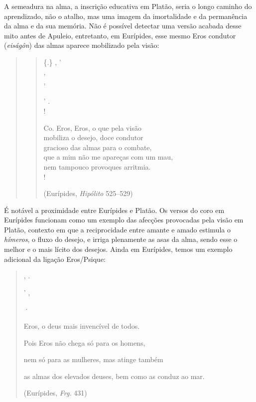 A semeadura na alma, a inscrição educativa em Platão, seria o longo
caminho do aprendizado, não o atalho, mas uma imagem da imortalidade e
da permanência da alma e da sua memória. Não é possível detectar uma
versão acabada desse mito antes de Apuleio, entretanto, em Eurípides, esse
mesmo Eros condutor (\emph{eiságôn}) das almas aparece mobilizado pela
visão:

 

\begin{quote}

\begin{verse}
\{.\}  ,  ' \\
 ,  \\
   ,\\
     \\
'  .\\!


{Co.} Eros, Eros, o que pela visão\\
mobiliza o desejo, doce condutor\\
gracioso das almas para o combate,\\
que a mim não me apareças com um mau,\\
nem tampouco provoques arritmia.\\!

\hfill (Eurípides, \emph{Hipólito} 525--529)
\end{verse}
\end{quote}

 

É notável a proximidade entre Eurípides e Platão. Os versos do coro em
Eurípides funcionam como um exemplo das afecções provocadas pela visão
em Platão, contexto em que a reciprocidade entre amante e amado estimula
o \emph{hímeros}, o fluxo do desejo, e irriga plenamente as asas da
alma, sendo esse o melhor e o mais lícito dos desejos. Ainda em
Eurípides, temos um exemplo adicional da ligação Eros/\allowbreak{}Psique:

 

\begin{quote}
,   .

     

'  ,    

    ·

 

Eros, o deus mais invencível de todos.

Pois Eros não chega só para os homens,

nem só para as mulheres, mas atinge também

as almas dos elevados deuses, bem como as conduz ao mar.

 

(Eurípides, \emph{Frg. }431)
\end{quote}

